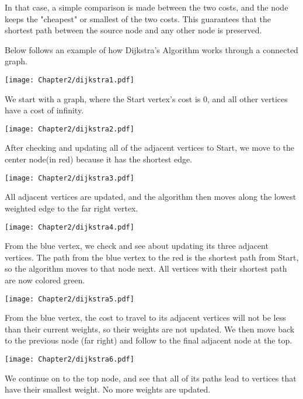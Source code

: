 In that case, a simple comparison is made between the two costs, and the node keeps the "cheapest" or smallest of the two costs. This guarantees that the shortest path between the source node and any other node is preserved.

Below follows an example of how Dijkstra's Algorithm works through a connected graph.

\begin{center}
\texttt{[image: Chapter2/dijkstra1.pdf]}
\end{center}
We start with a graph, where the Start vertex's cost is 0, and all other vertices have a cost of infinity.

\begin{center}
\texttt{[image: Chapter2/dijkstra2.pdf]}
\end{center}
After checking and updating all of the adjacent vertices to Start, we move to the center node(in red) because it has the shortest edge.

\begin{center}
\texttt{[image: Chapter2/dijkstra3.pdf]}
\end{center}
All adjacent vertices are updated, and the algorithm then moves along the lowest weighted edge to the far right vertex.


\begin{center}
\texttt{[image: Chapter2/dijkstra4.pdf]}
\end{center}
From the blue vertex, we check and see about updating its three adjacent vertices. The path from the blue vertex to the red is the shortest path from Start, so the algorithm moves to that node next. All vertices with their shortest path are now colored green. 

\begin{center}
\texttt{[image: Chapter2/dijkstra5.pdf]}
\end{center}
From the blue vertex, the cost to travel to its adjacent vertices will not be less than their current weights, so their weights are not updated. We then move back to the previous node (far right) and follow to the final adjacent node at the top.

\begin{center}
\texttt{[image: Chapter2/dijkstra6.pdf]}
\end{center}
We continue on to the top node, and see that all of its paths lead to vertices that have their smallest weight. No more weights are updated.


